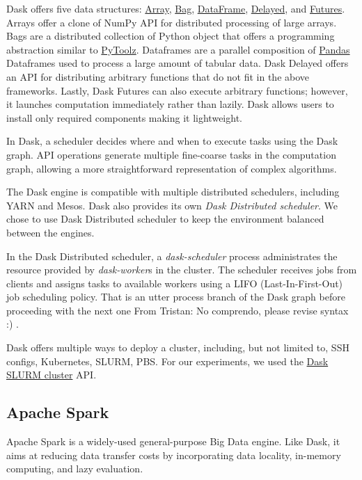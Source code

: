 \documentclass[conference]{IEEEtran}
\newcommand{\TG}[1]{\color{cyan}From Tristan: #1 \color{black}}
\begin{document}
Dask offers five data structures:
\href{https://docs.dask.org/en/latest/array.html}{Array},
\href{https://docs.dask.org/en/latest/bag.html}{Bag},
\href{https://docs.dask.org/en/latest/dataframe.html}{DataFrame},
\href{https://docs.dask.org/en/latest/delayed.html}{Delayed},
and \href{https://docs.dask.org/en/latest/futures.html}{Futures}.
Arrays offer a clone of NumPy API for distributed processing of large arrays.
Bags are a distributed collection of Python object that offers a programming abstraction similar to \href{https://toolz.readthedocs.io/en/latest/}{PyToolz}.
Dataframes are a parallel composition of \href{https://pandas.pydata.org/}{Pandas} Dataframes used to process a large amount of tabular data.
Dask Delayed offers an API for distributing arbitrary functions that do not fit in the above frameworks.
Lastly, Dask Futures can also execute arbitrary functions; however, it launches computation immediately rather than lazily.
Dask allows users to install only required components making it lightweight.

In Dask, a scheduler decides where and when to execute tasks using the Dask graph.
API operations generate multiple fine-coarse tasks in the computation graph, allowing a more straightforward representation of complex algorithms.

The Dask engine is compatible with multiple distributed schedulers, including YARN and Mesos.
Dask also provides its own \textit{Dask Distributed scheduler}.
We chose to use Dask Distributed scheduler to keep the environment balanced between the engines.

In the Dask Distributed scheduler, a \textit{dask-scheduler} process administrates the resource provided by  \textit{dask-worker}s in the cluster.
The scheduler receives jobs from clients and assigns tasks to available workers using a LIFO (Last-In-First-Out) job scheduling policy.
That is an utter process branch of the Dask graph before proceeding with the next one \TG{No comprendo, please revise syntax :)}.

Dask offers multiple ways to deploy a cluster, including, but not limited to, SSH configs, Kubernetes, SLURM, PBS.
For our experiments, we used the \href{https://jobqueue.dask.org/en/latest/generated/dask_jobqueue.SLURMCluster.html}{Dask SLURM cluster} API.

\subsection{Apache Spark}
Apache Spark is a widely-used general-purpose Big Data engine.
Like Dask, it aims at reducing data transfer costs by incorporating data locality, in-memory computing, and lazy evaluation.
\end{document}
